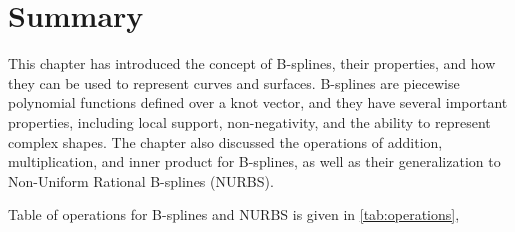 \section{Summary}

This chapter has introduced the concept of B-splines, their properties, and how they can be used to represent curves and surfaces. B-splines are piecewise polynomial functions defined over a knot vector, and they have several important properties, including local support, non-negativity, and the ability to represent complex shapes. The chapter also discussed the operations of addition, multiplication, and inner product for B-splines, as well as their generalization to Non-Uniform Rational B-splines (NURBS).

Table of operations for B-splines and NURBS is given in \cref{tab:operations}, 



